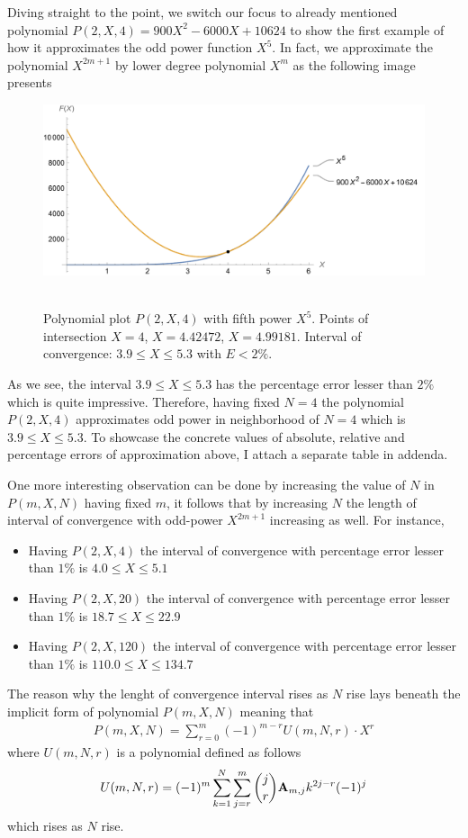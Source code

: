 Diving straight to the point, we switch our focus to already mentioned polynomial $P(2,X,4) = 900X^2 - 6000X + 10624$
to show the first example of how it approximates the odd power function $X^5$.
In fact, we approximate the polynomial $X^{2m+1}$ by lower degree polynomial $X^m$ as the following image presents
\begin{figure}[H]
    \centering
    \includegraphics[width=1\textwidth]{sections/images/03_plots_polynomial_p2_n4_with_fifth}
    ~\caption{Polynomial plot $P(2, X, 4)$ with fifth power $X^5$.
    Points of intersection $X=4$, $X=4.42472$, $X=4.99181$.
    Interval of convergence: $3.9 \leq X \leq 5.3$ with $E < 2\%$.
    }\label{fig:03_plots_polynomial_p2_n4_with_fifth}
\end{figure}
As we see, the interval $3.9 \leq X \leq 5.3$ has the percentage error lesser than $2\%$ which is quite impressive.
Therefore, having fixed $N=4$ the polynomial $P(2, X, 4)$ approximates odd power in neighborhood of $N=4$
which is $3.9 \leq X \leq 5.3$.
To showcase the concrete values of absolute, relative and percentage errors of approximation above, I attach a separate
table in addenda.

One more interesting observation can be done by increasing the value of $N$ in $P(m, X, N)$ having fixed $m$, it
follows that by increasing $N$ the length of interval of convergence with odd-power $X^{2m+1}$ increasing as well.
For instance,
\begin{itemize}
    \item Having $P(2, X, 4)$ the interval of convergence with percentage error lesser than $1\%$ is $4.0 \leq X \leq 5.1$
    \item Having $P(2, X, 20)$ the interval of convergence with percentage error lesser than $1\%$ is $18.7 \leq X \leq 22.9$
    \item Having $P(2, X, 120)$ the interval of convergence with percentage error lesser than $1\%$ is $110.0 \leq X \leq 134.7$
\end{itemize}
The reason why the lenght of convergence interval rises as $N$ rise lays beneath the implicit form of polynomial $P(m,X,N)$
meaning that
\begin{align*}
    P(m,X,N) = \sum_{r=0}^{m} (-1)^{m-r} U(m, N, r) \cdot X^{r}
\end{align*}
where $U(m, N, r)$ is a polynomial defined as follows
\begin{align*}
    U(m, N, r) = (-1)^m \sum_{k=1}^{N} \sum_{j=r}^{m} \binom{j}{r} {\mathbf{A}} \sb{m,j} k^{2j-r} (-1)^j
\end{align*}
which rises as $N$ rise.


